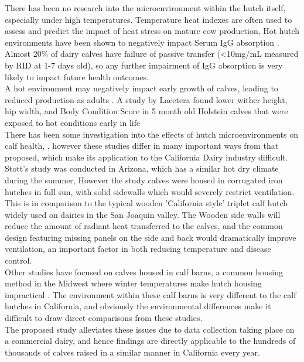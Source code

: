 \documentclass[12pt]{article}
\begin{document}
	There has been no research into the microenvironment within the hutch itself, especially under high temperatures. Temperature heat indexes are often used to assess and predict the impact of heat stress on mature cow production, 
	Hot hutch environments have been shown to negatively impact Serum IgG absorption \cite{Stott1976}. Almost 20\% of dairy calves have failure of passive transfer (<10mg/mL measured by RID at 1-7 days old)\cite{NAHMS2007}, so any further impairment of IgG absorption is very likely to impact future health outcomes.\cite{Besser1994}\\
	A hot environment may negatively impact early growth of calves, leading to reduced production as adults \cite{Hoffman1997}. A study by  Lacetera found lower wither height, hip width, and Body Condition Score in 5 month old Holstein calves that were exposed to hot conditions early in life \cite{lacetera1994} \\
	\newpage
	There has been some investigation into the effects of hutch microenvironments on calf health, \cite{Stott1976,Nordlund2008,Lago2006}, however these studies differ  in many important ways from that proposed, which make its application to the California Dairy industry difficult. 
	Stott's study was conducted in Arizona, which has a similar hot dry climate during the summer, However the study calves were housed in corrugated iron hutches in full sun, with solid sidewalls which would severely restrict ventilation\cite{Stott1976}. This is in comparison to the typical wooden 'California style' triplet calf hutch widely used on dairies in the San Joaquin valley. The Wooden side walls will reduce the amount of radiant heat transferred to the calves, and the common design featuring missing panels on the side and back would dramatically improve ventilation, an important factor in both reducing temperature and disease control\cite{Smith2002a}.\\
	Other studies have focused on calves housed in calf barns, a common housing method in the Midwest where winter temperatures make hutch housing impractical \cite{Lago2006}. The environment within these calf barns is very different to the calf hutches in California, and obviously the environmental differences make it difficult to draw direct comparisons from these studies.\\


	The proposed study alleviates these issues due to data collection taking place on a commercial dairy, and hence findings are directly applicable to the hundreds of thousands of calves raised in a similar manner in California every year. %
\end{document}
